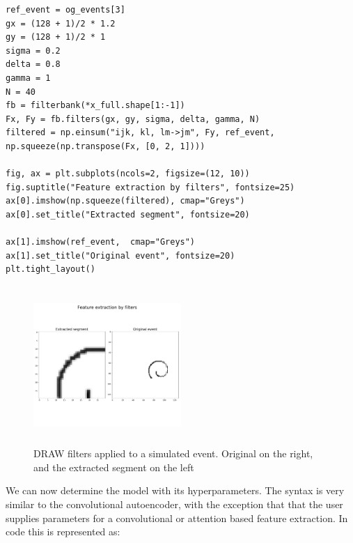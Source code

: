 \begin{minipage}{\linewidth}
\begin{lstlisting}[language=iPython]
ref_event = og_events[3]
gx = (128 + 1)/2 * 1.2
gy = (128 + 1)/2 * 1
sigma = 0.2
delta = 0.8
gamma = 1
N = 40
fb = filterbank(*x_full.shape[1:-1])
Fx, Fy = fb.filters(gx, gy, sigma, delta, gamma, N)
filtered = np.einsum("ijk, kl, lm->jm", Fy, ref_event, np.squeeze(np.transpose(Fx, [0, 2, 1])))

fig, ax = plt.subplots(ncols=2, figsize=(12, 10))
fig.suptitle("Feature extraction by filters", fontsize=25)
ax[0].imshow(np.squeeze(filtered), cmap="Greys")
ax[0].set_title("Extracted segment", fontsize=20)

ax[1].imshow(ref_event,  cmap="Greys")
ax[1].set_title("Original event", fontsize=20)
plt.tight_layout()
\end{lstlisting}
\end{minipage}
\begin{figure}[ht]
	\centering
	\includegraphics[width=0.5\textwidth, height=6cm]{filtered.pdf}
	\caption[DRAW filters applied to simulated event]{DRAW filters applied to a simulated event. Original on the right, and the extracted segment on the left}
	\label{fig:draw_filter}
\end{figure}

\noindent We can now determine the model with its hyperparameters. The syntax is very similar to the convolutional autoencoder, with the exception that that the user supplies parameters for a convolutional or attention based feature extraction. In code this is represented as: 

